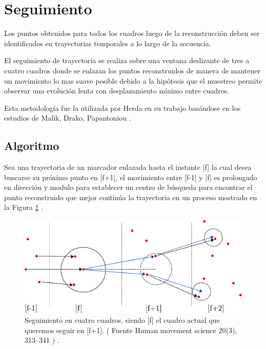 \section{Seguimiento}

Los puntos obtenidos para todos los cuadros luego de la reconstrucción deben ser identificados en trayectorias temporales a lo largo de la secuencia.


El seguimiento de trayectoria se realiza sobre una ventana deslizante de tres a cuatro cuadros donde se enlazan los puntos reconstruidos de manera de mantener un movimiento lo mas suave posible debido a la hipótesis que el muestreo permite observar una evolución lenta con desplazamiento mínimo entre cuadros.


Esta metodología fue la utilizada por Herda \cite{herda} en su trabajo basándose en los estudios de Malik, Drako, Papantoniou \cite{griegos} .

\subsection{Algoritmo}

Sea una trayectoria de un marcador enlazada hasta el instante [f] la cual desea buscarse su próximo punto en [f+1], el movimiento entre [f-1] y [f] es prolongado en dirección y modulo para establecer un centro de búsqueda para encontrar el punto reconstruido que mejor continúa la trayectoria en un proceso mostrado en la Figura \ref{herda_00} .

\begin{figure}[ht!]
\begin{center}
\includegraphics[scale=0.8]{imagenes/Seguimiento/tracking-eps-converted-to.pdf}
\end{center}
\caption{Seguimiento en cuatro cuadros, siendo [f] el cuadro actual que queremos seguir en [f+1]. ( Fuente  Human movement
science 20(3), 313–341 \cite{herda} ) .}
\label{herda_00}
\end{figure}

